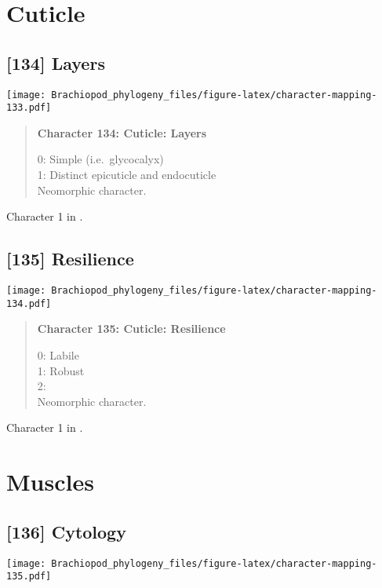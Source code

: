 \documentclass[openany]{book}
\theoremstyle{definition}
\theoremstyle{definition}
\theoremstyle{definition}
\theoremstyle{remark}
\begin{document}
\section{Cuticle}\label{cuticle}

\subsection*{{[}134{]} Layers}\label{layers}

\texttt{[image: Brachiopod\_phylogeny\_files/figure-latex/character-mapping-133.pdf]}

\begin{quote}
\textbf{Character 134: Cuticle: Layers}

0: Simple (i.e.~glycocalyx)\\
1: Distinct epicuticle and endocuticle\\
Neomorphic character.
\end{quote}

Character 1 in \citet{Haszprunar1996}.

\subsection*{{[}135{]} Resilience}\label{resilience}

\texttt{[image: Brachiopod\_phylogeny\_files/figure-latex/character-mapping-134.pdf]}

\begin{quote}
\textbf{Character 135: Cuticle: Resilience}

0: Labile\\
1: Robust\\
2:\\
Neomorphic character.
\end{quote}

Character 1 in \citet{Haszprunar2000}.

\section{Muscles}\label{muscles}

\subsection*{{[}136{]} Cytology}\label{cytology}

\texttt{[image: Brachiopod\_phylogeny\_files/figure-latex/character-mapping-135.pdf]}
\end{document}
